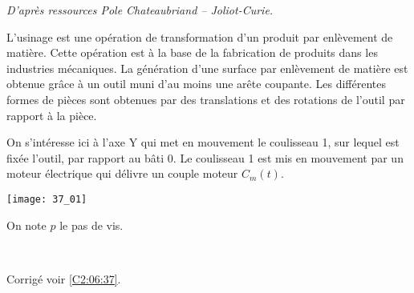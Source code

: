 \normaltrue \difficilefalse \tdifficilefalse
\correctionfalse


\textit{D'après ressources Pole Chateaubriand -- Joliot-Curie.}
\setcounter{question}{0}
\ifcorrection
\else
{}
\fi

\ifprof
\else
L’usinage est une opération de transformation d’un produit par enlèvement de matière.
Cette opération est à la base de la fabrication de produits dans les industries mécaniques.
La génération d’une surface par enlèvement de matière est obtenue grâce à un outil muni
d’au moins une arête coupante. Les différentes formes de pièces sont obtenues par des
translations et des rotations de l'outil par rapport à la pièce.


On s’intéresse ici à l’axe Y qui met en mouvement le coulisseau 1,
sur lequel est fixée l’outil, par rapport au bâti 0. Le coulisseau 1 est mis en mouvement par un moteur
électrique qui délivre un couple moteur $C_m(t)$.

\begin{center}
\texttt{[image: 37\_01]}
\end{center}

On note $p$ le pas de vis. 
\fi


\ifprof
\else
\fi

\ifprof ~\\
\else
\fi

\ifprof
\else
\begin{flushright}
\footnotesize{Corrigé  voir \ref{C2:06:37}.}
\end{flushright}%
\fi